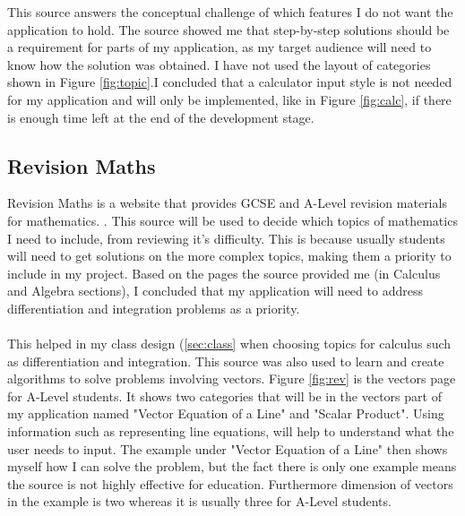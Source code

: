 \documentclass[final]{cmpreport}
\begin{document}
	This source answers the conceptual challenge of which features I do not want the application to hold. The source showed me that step-by-step solutions should be a requirement for parts of my application, as my target audience will need to know how the solution was obtained. I have not used the layout of categories shown in Figure \ref{fig:topic}.I concluded that a calculator input style is not needed for my application and will only be implemented, like in Figure \ref{fig:calc}, if there is enough time left at the end of the development stage.
	
	\subsection{Revision Maths} \label{sec:rev}
	
	Revision Maths is a website that provides GCSE and A-Level revision materials for mathematics. \citet{revision}. This source will be used to decide which topics of mathematics I need to include, from reviewing it's difficulty. This is because usually students will need to get solutions on the more complex topics, making them a priority to include in my project. Based on the pages the source provided me (in Calculus and Algebra sections), I concluded that my application will need to address differentiation and integration problems as a priority.\\
	\\This helped in my class design (\ref{sec:class} when choosing topics for calculus such as differentiation and integration. This source was also used to learn and create algorithms to solve problems involving vectors. Figure \ref{fig:rev} is the vectors page for A-Level students. It shows two categories that will be in the vectors part of my application named "Vector Equation of a Line" and "Scalar Product". Using information such as representing line equations, will help to understand what the user needs to input. The example under "Vector Equation of a Line" then shows myself how I can solve the problem, but the fact there is only one example means the source is not highly effective for education. Furthermore dimension of vectors in the example is two whereas it is usually three for A-Level students.\\
\end{document}
